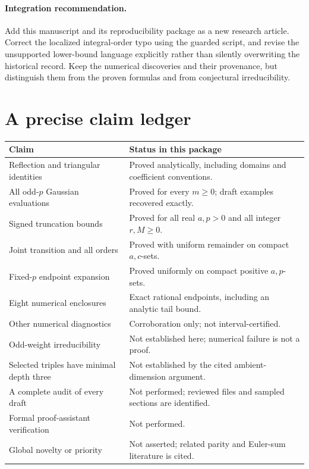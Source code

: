 \documentclass[11pt]{article}
\numberwithin{equation}{section}
\theoremstyle{definition}\newtheorem{definition}[theorem]{Definition}
\theoremstyle{remark}\newtheorem{remark}[theorem]{Remark}
\begin{document}
\paragraph{Integration recommendation.}
Add this manuscript and its reproducibility package as a new research article. Correct the localized integral-order typo using the guarded script, and revise the unsupported lower-bound language explicitly rather than silently overwriting the historical record. Keep the numerical discoveries and their provenance, but distinguish them from the proven formulas and from conjectural irreducibility.

\appendix
\section{A precise claim ledger}
\begin{longtable}{>{\raggedright\arraybackslash}p{}p{}}
\toprule
Claim&Status in this package\\\midrule\endhead
Reflection and triangular identities&Proved analytically, including domains and coefficient conventions.\\
All odd-$p$ Gaussian evaluations&Proved for every $m\ge0$; draft examples recovered exactly.\\
Signed truncation bounds&Proved for all real $a,p>0$ and all integer $r,M\ge0$.\\
Joint transition and all orders&Proved with uniform remainder on compact $a,c$-sets.\\
Fixed-$p$ endpoint expansion&Proved uniformly on compact positive $a,p$-sets.\\
Eight numerical enclosures&Exact rational endpoints, including an analytic tail bound.\\
Other numerical diagnostics&Corroboration only; not interval-certified.\\
Odd-weight irreducibility&Not established here; numerical failure is not a proof.\\
Selected triples have minimal depth three&Not established by the cited ambient-dimension argument.\\
A complete audit of every draft&Not performed; reviewed files and sampled sections are identified.\\
Formal proof-assistant verification&Not performed.\\
Global novelty or priority&Not asserted; related parity and Euler-sum literature is cited.\\
\bottomrule
\end{longtable}
\end{document}
